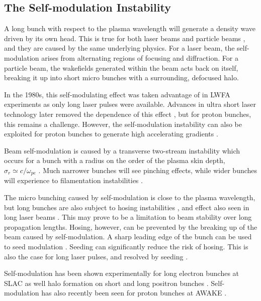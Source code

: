 \subsection{The Self-modulation Instability}
\label{Int:DBeam:SMI}

A long bunch with respect to the plasma wavelength will generate a density wave driven by its own head. This is true for both laser beams \cite{esarey:1994} and particle beams \cite{kumar:2010}, and they are caused by the same underlying physics. For a laser beam, the self-modulation arises from alternating regions of focusing and diffraction. For a particle beam, the wakefields generated within the beam acts back on itself, breaking it up into short micro bunches with a surrounding, defocused halo.

In the 1980s, this self-modulating effect was taken advantage of in LWFA experiments as only long laser pulses were available. Advances in ultra short laser technology later removed the dependence of this effect \cite{pukhov:2002}, but for proton bunches, this remains a challenge. However, the self-modulation instability can also be exploited for proton bunches to generate high accelerating gradients \cite{schroeder:2012,schroeder:2011,caldwell:2009}.

Beam self-modulation is caused by a transverse two-stream instability which occurs for a bunch with a radius on the order of the plasma skin depth, $\sigma_{r} \simeq c/\omega_{pe}$ \cite{vieira:2012}. Much narrower bunches will see pinching effects, while wider bunches will experience to filamentation instabilities \cite{keinigs:1987}.

The micro bunching caused by self-modulation is close to the plasma wavelength, but long bunches are also subject to hosing instabilities \cite{whittum:1991}, and effect also seen in long laser beams \cite{duda:1999,duda:2000}. This may prove to be a limitation to beam stability over long propagation lengths. Hosing, however, can be prevented by the breaking up of the beam caused by self-modulation. A sharp leading edge of the bunch can be used to seed modulation \cite{fang:2014}. Seeding can significantly reduce the risk of hosing. This is also the case for long laser pulses, and resolved by seeding \cite{vieira:2012}. 

Self-modulation has been shown experimentally for long electron bunches at SLAC \cite{muggli:2014,muggli:2015} as well halo formation on short and long positron bunches \cite{muggli:2008,hogan:2003}. Self-modulation has also recently been seen for proton bunches at AWAKE \cite{muggli:2017a}.

